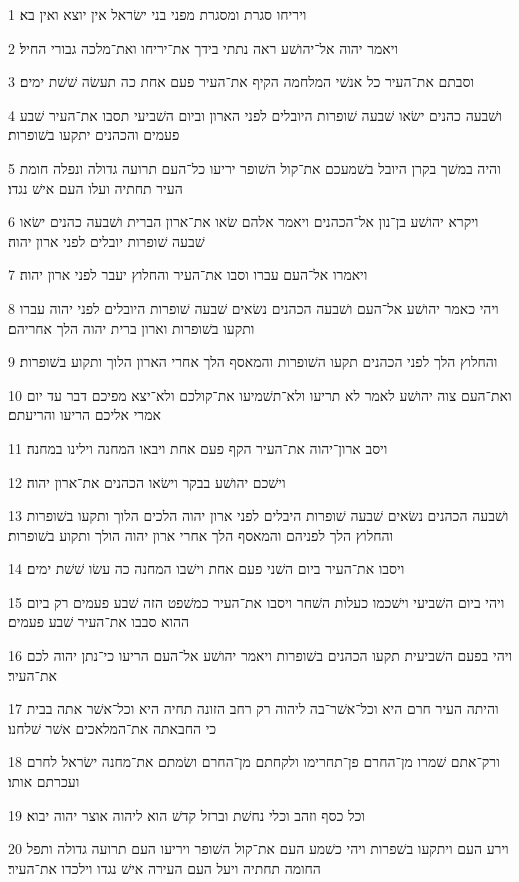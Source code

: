 \par 1 ויריחו סגרת ומסגרת מפני בני ישׂראל אין יוצא ואין בא׃
\par 2 ויאמר יהוה אל־יהושׁע ראה נתתי בידך את־יריחו ואת־מלכה גבורי החיל׃
\par 3 וסבתם את־העיר כל אנשׁי המלחמה הקיף את־העיר פעם אחת כה תעשׂה שׁשׁת ימים׃
\par 4 ושׁבעה כהנים ישׂאו שׁבעה שׁופרות היובלים לפני הארון וביום השׁביעי תסבו את־העיר שׁבע פעמים והכהנים יתקעו בשׁופרות׃
\par 5 והיה במשׁך בקרן היובל בשׁמעכם את־קול השׁופר יריעו כל־העם תרועה גדולה ונפלה חומת העיר תחתיה ועלו העם אישׁ נגדו׃
\par 6 ויקרא יהושׁע בן־נון אל־הכהנים ויאמר אלהם שׂאו את־ארון הברית ושׁבעה כהנים ישׂאו שׁבעה שׁופרות יובלים לפני ארון יהוה׃
\par 7 ויאמרו אל־העם עברו וסבו את־העיר והחלוץ יעבר לפני ארון יהוה׃
\par 8 ויהי כאמר יהושׁע אל־העם ושׁבעה הכהנים נשׂאים שׁבעה שׁופרות היובלים לפני יהוה עברו ותקעו בשׁופרות וארון ברית יהוה הלך אחריהם׃
\par 9 והחלוץ הלך לפני הכהנים תקעו השׁופרות והמאסף הלך אחרי הארון הלוך ותקוע בשׁופרות׃
\par 10 ואת־העם צוה יהושׁע לאמר לא תריעו ולא־תשׁמיעו את־קולכם ולא־יצא מפיכם דבר עד יום אמרי אליכם הריעו והריעתם׃
\par 11 ויסב ארון־יהוה את־העיר הקף פעם אחת ויבאו המחנה וילינו במחנה׃
\par 12 וישׁכם יהושׁע בבקר וישׂאו הכהנים את־ארון יהוה׃
\par 13 ושׁבעה הכהנים נשׂאים שׁבעה שׁופרות היבלים לפני ארון יהוה הלכים הלוך ותקעו בשׁופרות והחלוץ הלך לפניהם והמאסף הלך אחרי ארון יהוה הולך ותקוע בשׁופרות׃
\par 14 ויסבו את־העיר ביום השׁני פעם אחת וישׁבו המחנה כה עשׂו שׁשׁת ימים׃
\par 15 ויהי ביום השׁביעי וישׁכמו כעלות השׁחר ויסבו את־העיר כמשׁפט הזה שׁבע פעמים רק ביום ההוא סבבו את־העיר שׁבע פעמים׃
\par 16 ויהי בפעם השׁביעית תקעו הכהנים בשׁופרות ויאמר יהושׁע אל־העם הריעו כי־נתן יהוה לכם את־העיר׃
\par 17 והיתה העיר חרם היא וכל־אשׁר־בה ליהוה רק רחב הזונה תחיה היא וכל־אשׁר אתה בבית כי החבאתה את־המלאכים אשׁר שׁלחנו׃
\par 18 ורק־אתם שׁמרו מן־החרם פן־תחרימו ולקחתם מן־החרם ושׂמתם את־מחנה ישׂראל לחרם ועכרתם אותו׃
\par 19 וכל כסף וזהב וכלי נחשׁת וברזל קדשׁ הוא ליהוה אוצר יהוה יבוא׃
\par 20 וירע העם ויתקעו בשׁפרות ויהי כשׁמע העם את־קול השׁופר ויריעו העם תרועה גדולה ותפל החומה תחתיה ויעל העם העירה אישׁ נגדו וילכדו את־העיר׃
